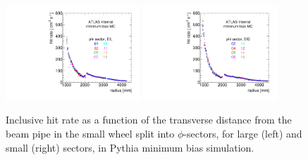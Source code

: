 \begin{figure}
  \begin{center}
    \includegraphics[width=0.45\textwidth]{./figures/rate_raw_vs_r_phi_EIL_00119994.pdf}
    \includegraphics[width=0.45\textwidth]{./figures/rate_raw_vs_r_phi_EIS_00119994.pdf}
    \caption{Inclusive hit rate as a function of the transverse distance from the beam pipe in the small wheel split into $\phi$-sectors, for large (left) and small (right) sectors, in Pythia minimum bias simulation.}
    \label{fig:hitrates-vs-r-phi-mc}
  \end{center}
\end{figure}



